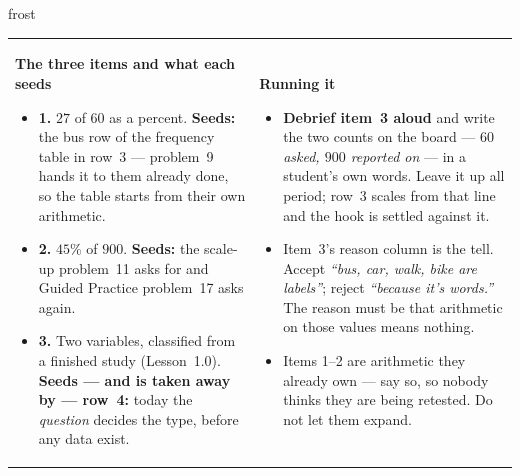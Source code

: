 \documentclass[10pt]{article}
\begin{document}
\begin{fixedskillbox}{frost}
\begin{tabularx}{\linewidth}{@{}X X@{}}
\begin{minipage}[t]{\linewidth}\vspace{0pt}
    \textbf{The three items and what each seeds}
    \begin{itemize}[leftmargin=1.1em, itemsep=1pt, topsep=2pt]
      \item \textbf{1.} $27$ of $60$ as a percent. \textbf{Seeds:} the bus row of the
            frequency table in row~3 --- problem~9 hands it to them already done, so the
            table starts from their own arithmetic.
      \item \textbf{2.} $45\%$ of $900$. \textbf{Seeds:} the scale-up problem~11 asks for and
            Guided Practice problem~17 asks again.
      \item \textbf{3.} Two variables, classified from a finished study (Lesson~1.0).
            \textbf{Seeds --- and is taken away by --- row~4:} today the \emph{question}
            decides the type, before any data exist.
    \end{itemize}
\end{minipage}
&
\begin{minipage}[t]{\linewidth}\vspace{0pt}
    \textbf{Running it}
    \begin{itemize}[leftmargin=1.1em, itemsep=1pt, topsep=2pt]
      \item \textbf{Debrief item~3 aloud} and write the two counts on the board --- \emph{$60$
            asked, $900$ reported on} --- in a student's own words. Leave it up all period;
            row~3 scales from that line and the hook is settled against it.
      \item Item~3's reason column is the tell. Accept \emph{``bus, car, walk, bike are
            labels''}; reject \emph{``because it's words.''} The reason must be that
            arithmetic on those values means nothing.
      \item Items 1--2 are arithmetic they already own --- say so, so nobody thinks they are
            being retested. Do not let them expand.
    \end{itemize}
\end{minipage}
\end{tabularx}
\end{fixedskillbox}
\end{document}
